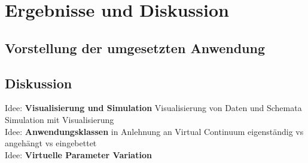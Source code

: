 \section{Ergebnisse und Diskussion}
\label{sec-6}

\subsection{Vorstellung der umgesetzten Anwendung}

\subsection{Diskussion}

Idee: 
\textbf{Visualisierung und Simulation}
Visualisierung von Daten und Schemata
Simulation mit Visualisierung\\

Idee: \textbf{Anwendungsklassen}
in Anlehnung an Virtual Continuum
eigenständig vs angehängt vs eingebettet\\

Idee: \textbf{Virtuelle Parameter Variation}



	
	
	
	
	
	
	
	
	
	
	
	
	
	
	
	
	